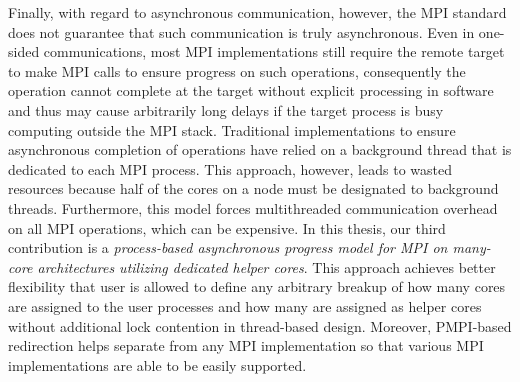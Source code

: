 Finally, with regard to asynchronous communication, however, the MPI standard does 
not guarantee that such communication is truly asynchronous. Even in one-sided 
communications, most MPI implementations still require the remote target to make 
MPI calls to ensure progress on such operations, consequently the operation 
cannot complete at the target without explicit processing in software and 
thus may cause arbitrarily long delays if the target process is busy computing 
outside the MPI stack. Traditional implementations to ensure asynchronous 
completion of operations have relied on a background thread that is 
dedicated to each MPI process. This approach, however, leads to wasted resources
because half of the cores on a node must be designated to background threads. 
Furthermore, this model forces multithreaded communication overhead on all MPI 
operations, which can be expensive. In this thesis, our third contribution is 
a \textit{process-based asynchronous progress model for MPI on many-core 
architectures utilizing dedicated helper cores}. This approach achieves better 
flexibility that user is allowed to define any arbitrary breakup of how many 
cores are assigned to the user processes and how many are assigned as helper 
cores without additional lock contention in thread-based design. Moreover, 
PMPI-based redirection helps separate from any MPI implementation so that various 
MPI implementations are able to be easily supported. 

\clearpage

